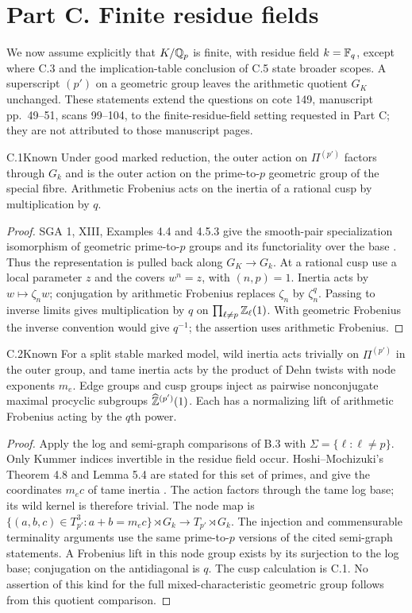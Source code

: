 \section{Part C. Finite residue fields}
\label{sec:C}
We now assume explicitly that $K/\mathbb Q_p$ is finite, with residue field
$k=\mathbb F_q$, except where C.3 and the implication-table conclusion of C.5
state broader scopes. A superscript $(p')$ on a geometric group leaves the
arithmetic quotient $G_K$ unchanged. These statements extend the questions
on cote 149, manuscript pp.~49--51, scans 99--104, to the finite-residue-field
setting requested in Part C; they are not attributed to those manuscript pages.

\begin{claim}{C.1}{Known}
Under good marked reduction, the outer action on $\Pi^{(p')}$ factors
through $G_k$ and is the outer action on the prime-to-$p$ geometric group of
the special fibre. Arithmetic Frobenius acts on the inertia of a rational
cusp by multiplication by $q$.
\end{claim}
\begin{proof}
SGA 1, XIII, Examples 4.4 and 4.5.3 give the smooth-pair specialization
isomorphism of geometric prime-to-$p$ groups and its functoriality over
the base \citep{BC_SGA1}. Thus the representation is pulled back along
$G_K\to G_k$. At a rational cusp use a local parameter $z$ and the covers
$w^n=z$, with $(n,p)=1$. Inertia acts by $w\mapsto\zeta_nw$;
conjugation by arithmetic Frobenius replaces $\zeta_n$ by $\zeta_n^q$.
Passing to inverse limits gives multiplication by $q$ on
$\prod_{\ell\ne p}\mathbb Z_\ell(1)$. With geometric Frobenius the inverse
convention would give $q^{-1}$; the assertion uses arithmetic Frobenius.
\end{proof}

\begin{claim}{C.2}{Known}
For a split stable marked model, wild inertia acts trivially on
$\Pi^{(p')}$ in the outer group, and tame inertia acts by the product of
Dehn twists with node exponents $m_e$. Edge groups and cusp groups inject
as pairwise nonconjugate maximal procyclic subgroups
$\widehat{\mathbb Z}^{(p')}(1)$. Each has a normalizing lift of arithmetic Frobenius
acting by the $q$th power.
\end{claim}
\begin{proof}
Apply the log and semi-graph comparisons of B.3 with
$\Sigma=\{\ell:\ell\ne p\}$. Only Kummer indices invertible in the residue
field occur. Hoshi--Mochizuki's Theorem 4.8 and Lemma 5.4 are stated for
this set of primes, and give the coordinates $m_ec$ of tame inertia
\citep{BC_HMTopics}. The action factors through the tame log base; its
wild kernel is therefore trivial. The node map is
$\{(a,b,c)\in T_{p'}^3:a+b=m_ec\}\rtimes G_k\to T_{p'}\rtimes G_k$.
The injection and commensurable terminality arguments use the same
prime-to-$p$ versions of the cited semi-graph statements. A Frobenius lift
in this node group exists by its surjection to the log base; conjugation
on the antidiagonal is $q$. The cusp calculation is C.1. No assertion of
this kind for the full mixed-characteristic geometric group follows from
this quotient comparison.
\end{proof}

